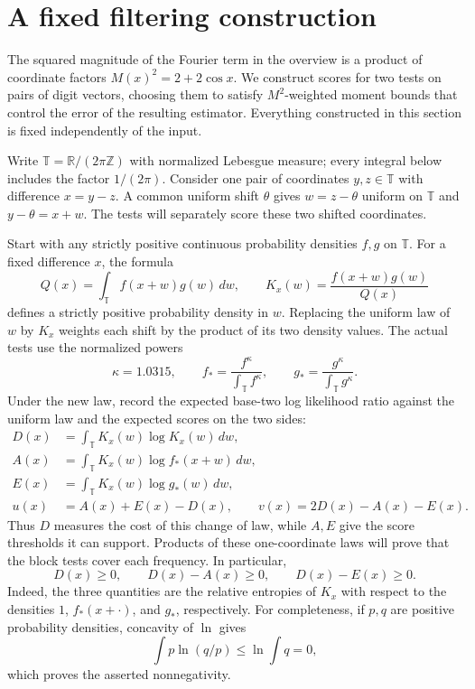 \section{A fixed filtering construction}\label{sec:filtering}

The squared magnitude of the Fourier term in the overview is a product
of coordinate factors $M(x)^2=2+2\cos x$.  We construct scores for two tests on pairs of digit
vectors, choosing them to satisfy $M^2$-weighted moment bounds
that control the error of the resulting estimator.  Everything
constructed in this section is fixed independently of the input.

Write $\mathbb T=\mathbb R/(2\pi\mathbb Z)$ with normalized Lebesgue
measure; every integral below includes the factor $1/(2\pi)$.
Consider one pair of coordinates $y,z\in\mathbb T$ with difference
$x=y-z$.  A common uniform shift $\theta$ gives
$w=z-\theta$ uniform on $\mathbb T$ and $y-\theta=x+w$.
The tests will separately score these two shifted coordinates.

Start with any strictly positive continuous probability densities $f,g$
on $\mathbb T$.  For a fixed difference $x$, the formula
\begin{equation}\label{eq:filter-kernel}
 Q(x)=\int_{\mathbb T} f(x+w)g(w)\,dw,
 \qquad K_x(w)=\frac{f(x+w)g(w)}{Q(x)}
\end{equation}
defines a strictly positive probability density in $w$.  Replacing the
uniform law of $w$ by $K_x$ weights each shift by the product of its two
density values.  The actual tests use the normalized powers
\[
 \kappa=1.0315,\qquad
 f_* =\frac{f^\kappa}{\int_{\mathbb T} f^\kappa},\qquad
 g_* =\frac{g^\kappa}{\int_{\mathbb T} g^\kappa}.
\]
Under the new law, record the expected base-two log likelihood ratio
against the uniform law and the expected scores on the two sides:
\begin{equation}\label{eq:filter-scores}
\begin{split}
 D(x)&=\int_{\mathbb T}K_x(w)\log K_x(w)\,dw,\\
 A(x)&=\int_{\mathbb T}K_x(w)\log f_*(x+w)\,dw,\\
 E(x)&=\int_{\mathbb T}K_x(w)\log g_*(w)\,dw,\\
 u(x)&=A(x)+E(x)-D(x),\qquad
 v(x)=2D(x)-A(x)-E(x).
\end{split}
\end{equation}
Thus $D$ measures the cost of this change of law, while $A,E$ give the
score thresholds it can support.  Products of these one-coordinate
laws will prove that the block tests cover each frequency.  In particular,
\begin{equation}\label{eq:filter-entropy-order}
 D(x)\ge0,\qquad D(x)-A(x)\ge0,\qquad D(x)-E(x)\ge0.
\end{equation}
Indeed, the three quantities are the relative entropies of $K_x$ with
respect to the densities $1$, $f_*(x+\cdot)$, and $g_*$, respectively.
For completeness, if $p,q$ are positive probability densities, concavity
of $\ln$ gives
\[
 \int p\ln(q/p)\le \ln\int q=0,
\]
which proves the asserted nonnegativity.

